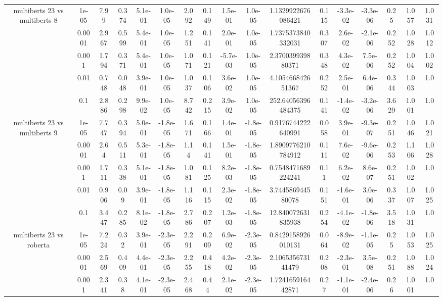 \begin{tabular}{|c|c|c|c|c|c|c|c|c|c|c|c|c|c|c|c|c|}
\hline
\multirow{5}{*}{multiberts 23 vs multiberts 8} & 1e-05 & 7.99 & 0.374 & 5.1e-01 & 1.0e-05 & 2.092 & 0.149 & 1.5e-01 & 1.0e-05 & 1.1329922676086421 & 0.115 & -3.3e-02 & -3.3e-06 & 0.25 & 1.057 & 1.031 \\
 & 0.0001 & 2.967 & 0.599 & 5.4e-01 & 1.0e-05 & 1.251 & 0.141 & 2.0e-01 & 1.0e-05 & 1.7375373840332031 & 0.307 & 2.6e-02 & -2.1e-06 & 0.252 & 1.028 & 1.012 \\
 & 0.001 & 1.794 & 0.371 & 5.4e-01 & 1.0e-05 & 1.071 & 0.121 & -5.7e-03 & 1.0e-05 & 2.370039939880371 & 0.348 & 4.3e-02 & 7.5e-06 & 0.252 & 1.004 & 1.002 \\
 & 0.01 & 0.748 & 0.048 & 3.9e-01 & 1.0e-05 & 1.037 & 0.106 & 3.6e-02 & 1.0e-05 & 4.105466842651367 & 0.252 & 2.5e-01 & 6.4e-06 & 0.344 & 1.003 & 1.0 \\
 & 0.1 & 2.886 & 0.298 & 9.9e-02 & 1.0e-05 & 8.742 & 0.215 & 3.9e-02 & 1.0e-05 & 252.64056396484375 & 0.141 & -1.4e-02 & -3.2e-06 & 3.629 & 1.001 & 1.0 \\
\hline
\multirow{5}{*}{multiberts 23 vs multiberts 9} & 1e-05 & 7.747 & 0.394 & 5.0e-01 & -1.8e-05 & 1.671 & 0.166 & 1.4e-01 & -1.8e-05 & 0.9176744222640991 & 0.058 & 3.9e-01 & -9.3e-07 & 0.251 & 1.046 & 1.021 \\
 & 0.0001 & 2.64 & 0.511 & 5.3e-01 & -1.8e-05 & 1.14 & 0.141 & 1.5e-01 & -1.8e-05 & 1.8909776210784912 & 0.111 & 7.6e-02 & -9.6e-06 & 0.253 & 1.106 & 1.028 \\
 & 0.001 & 1.711 & 0.338 & 5.1e-01 & -1.8e-05 & 1.081 & 0.125 & 8.2e-03 & -1.8e-05 & 0.7548471689224241 & 0.11 & 6.2e-02 & 8.6e-07 & 0.251 & 1.002 & 1.0 \\
 & 0.01 & 0.906 & 0.09 & 3.9e-01 & -1.8e-05 & 1.116 & 0.115 & 2.3e-02 & -1.8e-05 & 3.744586944580078 & 0.151 & -1.6e-01 & 3.0e-06 & 0.337 & 1.007 & 1.025 \\
 & 0.1 & 3.447 & 0.285 & 8.1e-02 & -1.8e-05 & 2.786 & 0.207 & 1.2e-03 & -1.8e-05 & 12.840072631835938 & 0.254 & -4.1e-02 & -1.8e-06 & 3.518 & 1.031 & 1.0 \\
\hline
\multirow{5}{*}{multiberts 23 vs roberta } & 1e-05 & 7.224 & 0.32 & 3.9e-01 & -2.3e-05 & 2.291 & 0.209 & 6.9e-02 & -2.3e-05 & 0.8429158926010131 & 0.064 & -8.9e-02 & -1.1e-05 & 0.25 & 1.053 & 1.025 \\
 & 0.0001 & 2.569 & 0.409 & 4.4e-01 & -2.3e-05 & 2.255 & 0.418 & 4.2e-02 & -2.3e-05 & 2.106535673141479 & 0.208 & -2.3e-01 & 3.5e-08 & 0.251 & 1.088 & 1.024 \\
 & 0.001 & 2.341 & 0.38 & 4.1e-01 & -2.3e-05 & 2.468 & 0.44 & 2.1e-02 & -2.3e-05 & 1.724165916442871 & 0.27 & -1.1e-01 & -2.4e-06 & 0.26 & 1.001 & 1.0 \\

\end{tabular}

